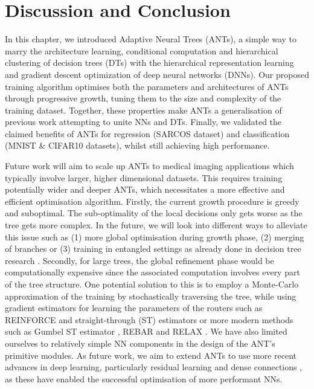 
\section{Discussion and Conclusion}
In this chapter, we introduced Adaptive Neural Trees (ANTs), a simple way to marry the architecture learning, conditional computation and hierarchical clustering of decision trees (DTs) with the hierarchical representation learning and gradient descent optimization of deep neural networks (DNNs). Our proposed training algorithm optimises both the parameters and architectures of ANTs through progressive growth, tuning them to the size and complexity of the training dataset. Together, these properties make ANTs a generalisation of previous work attempting to unite NNs and DTs. Finally, we validated the claimed benefits of ANTs for regression (SARCOS dataset) and classification (MNIST \& CIFAR10 datasets), whilst still achieving high performance. 

Future work will aim to scale up ANTs to medical imaging applications which typically involve larger, higher dimensional datasets. This requires training potentially wider and deeper ANTs, which necessitates a more effective and efficient optimisation algorithm. Firstly, the current growth procedure is greedy and suboptimal. The sub-optimality of the local decisions only gets worse as the tree gets more complex. In the future, we will look into different ways to alleviate this issue such as (1)  more global optimisation during growth phase, (2) merging of branches \cite{shotton2013decision} or (3) training in entangled settings as already done in decision tree research \cite{montillo2011entangled}. Secondly, for large trees, the global refinement phase would be computationally expensive since the associated computation involves every part of the tree structure. One potential solution to this is to employ a Monte-Carlo approximation of the training by stochastically traversing the tree, while using gradient estimators for learning the parameters of the routers such as REINFORCE and straight-through (ST) estimators \cite{bengio2013} or more modern methods such as Gumbel ST estimator \cite{jang2016categorical}, REBAR \cite{tucker2017rebar} and RELAX \cite{grathwohl2017backpropagation}. We have also limited ourselves to relatively simple NN components in the design of the ANT's primitive modules. As future work, we aim to extend ANTs to use more recent advances in deep learning, particularly residual learning \cite{he2016deep} and dense connections \cite{huang2017densely}, as these have enabled the successful optimisation of more performant NNs. 

